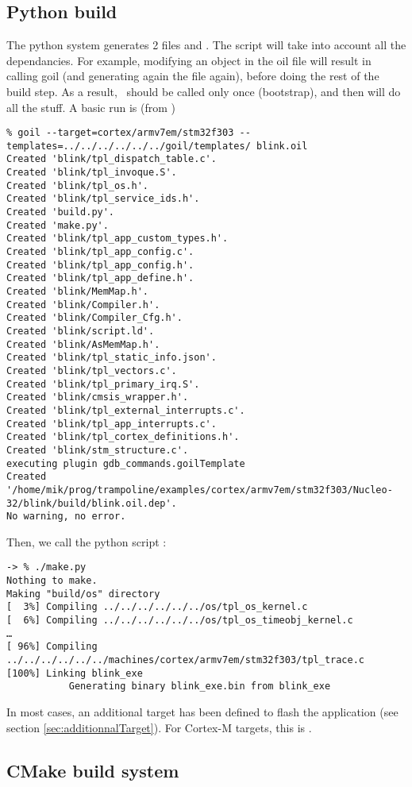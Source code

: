 \subsection{Python build}
The python system generates 2 files  and . The script will take into account all the dependancies. For example, modifying an object in the oil file will result in calling goil (and generating again the  file again), before doing the rest of the build step. As a result, \goil\ should be called only once (bootstrap), and then  will do all the stuff.
A basic run is (from )
\begin{verbatim}
% goil --target=cortex/armv7em/stm32f303 --templates=../../../../../../goil/templates/ blink.oil
Created 'blink/tpl_dispatch_table.c'.
Created 'blink/tpl_invoque.S'.
Created 'blink/tpl_os.h'.
Created 'blink/tpl_service_ids.h'.
Created 'build.py'.
Created 'make.py'.
Created 'blink/tpl_app_custom_types.h'.
Created 'blink/tpl_app_config.c'.
Created 'blink/tpl_app_config.h'.
Created 'blink/tpl_app_define.h'.
Created 'blink/MemMap.h'.
Created 'blink/Compiler.h'.
Created 'blink/Compiler_Cfg.h'.
Created 'blink/script.ld'.
Created 'blink/AsMemMap.h'.
Created 'blink/tpl_static_info.json'.
Created 'blink/tpl_vectors.c'.
Created 'blink/tpl_primary_irq.S'.
Created 'blink/cmsis_wrapper.h'.
Created 'blink/tpl_external_interrupts.c'.
Created 'blink/tpl_app_interrupts.c'.
Created 'blink/tpl_cortex_definitions.h'.
Created 'blink/stm_structure.c'.
executing plugin gdb_commands.goilTemplate
Created '/home/mik/prog/trampoline/examples/cortex/armv7em/stm32f303/Nucleo-32/blink/build/blink.oil.dep'.
No warning, no error.
\end{verbatim}
Then, we call the python script :
\begin{verbatim}
-> % ./make.py 
Nothing to make.
Making "build/os" directory
[  3%] Compiling ../../../../../../os/tpl_os_kernel.c
[  6%] Compiling ../../../../../../os/tpl_os_timeobj_kernel.c
…
[ 96%] Compiling ../../../../../../machines/cortex/armv7em/stm32f303/tpl_trace.c
[100%] Linking blink_exe
		   Generating binary blink_exe.bin from blink_exe	
\end{verbatim}

In most cases, an additional target has been defined to flash the application (see section \ref{sec:additionnalTarget}). For Cortex-M targets, this is .

\subsection{CMake build system}

